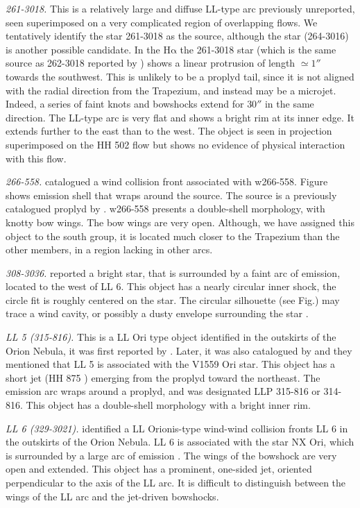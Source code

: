 \documentclass[apj, twocolumn]{aastex63}
\newcommand\ha{\ensuremath{\mathrm{H\alpha}}}
\begin{document}
\textit{261-3018.} This is a relatively large and diffuse LL-type
arc previously unreported, seen superimposed on a very complicated
region of overlapping flows. We tentatively identify the star 261-3018
as the source, although the star (264-3016) is another possible
candidate. In the \ha{} the 261-3018 star (which is the same source
as 262-3018 reported by \citealp{Bally:2006a})  shows a linear protrusion
of length \(\simeq1''\) towards the southwest. This is unlikely to be
a proplyd tail, since it is not aligned with the radial direction from
the Trapezium, and instead may be a microjet. Indeed, a series of faint
knots and bowshocks extend for \(30''\) in the same direction.
The LL-type arc is very flat and shows a bright rim at its inner edge.
It extends further to the east than to the west. The object is seen
in projection superimposed on the HH 502 flow but shows no evidence
of physical interaction with this flow.

\textit{266-558.} \citet{Bally:2000a} catalogued a wind collision
front associated with w266-558. Figure shows emission shell that
wraps around the source. The source is a previously catalogued
proplyd by \citet{Ricci:2008a}. w266-558 presents a double-shell
morphology, with knotty bow wings. The bow wings are very open.
Although, we have assigned this object to the south group, it is
located much closer to the Trapezium than the other members, in
a region lacking in other arcs.
    

\textit{308-3036.} \citet{Bally:2006a} reported a bright star,
that is surrounded by a faint arc of emission, located to the west
of LL 6. This object has a nearly circular inner shock, the circle
fit is roughly centered on the star. The circular silhouette
(see Fig.) may trace a wind cavity, or possibly a dusty envelope
surrounding the star \citep{Bally:2006a}.       

\textit{LL 5 (315-816).} This is a LL Ori type object identified in
the outskirts of the Orion Nebula, it was first reported by
\citet{Bally:2001a}. Later, it was also catalogued by
\citet{Bally:2006a} and they mentioned that LL 5 is associated
with the  V1559 Ori star. This object has a short jet (HH 875
\citealp{Bally:2006a}) emerging from the proplyd toward the northeast.
The emission arc wraps around a proplyd, and was designated LLP 315-816
or 314-816. This object has a double-shell morphology with a bright
inner rim.
       
\textit{LL 6 (329-3021).} \citep{Bally:2001a} identified a LL Orionis-type
wind-wind collision fronts LL 6 in the outskirts of the Orion Nebula. LL 6
is associated with the star NX Ori, which is surrounded by a large arc of
emission \citep{Bally:2006a}. The wings of the bowshock are very open and
extended. This object has a prominent, one-sided jet, oriented perpendicular
to the axis of the LL arc. It is difficult to distinguish between the wings
of the LL arc and the jet-driven bowshocks.    
\end{document}
